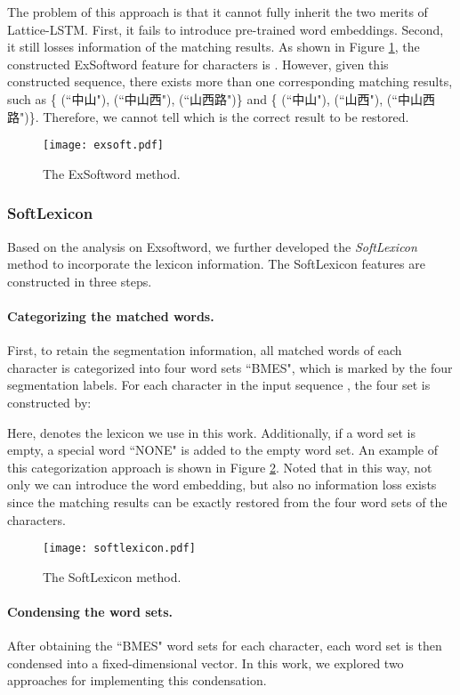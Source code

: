 \documentclass[11pt,a4paper]{article}
\begin{document}
\begin{CJK}{UTF8}{gbsn}
The problem of this approach is that it cannot fully inherit the two merits of Lattice-LSTM. First, it fails to introduce pre-trained word embeddings. Second, it still losses information of the matching results.
As shown in Figure \ref{fig:exsoft_figure}, the constructed ExSoftword feature for characters  is . However, given this constructed sequence, there exists more than one corresponding matching results, such as \{ (``中山"),  (``中山西"),  (``山西路")\} and \{ (``中山"),  (``山西"),  (``中山西路")\}. Therefore, we cannot tell which is the correct result to be restored.


\begin{figure}
\centering
\texttt{[image: exsoft.pdf]}
\caption{The ExSoftword method. }
\label{fig:exsoft_figure}
\end{figure}

\subsubsection{SoftLexicon} 
\label{sec:method}
Based on the analysis on Exsoftword, we further developed the \textit{SoftLexicon} method to incorporate the lexicon information.
The SoftLexicon features are constructed in three steps. 

\paragraph{Categorizing the matched words.}
First, to retain the segmentation information, all matched words of each character  is categorized into four word sets ``BMES", which is marked by the four segmentation labels. For each character  in the input sequence , the four set is constructed by:

Here,  denotes the lexicon we use in this work.
Additionally, if a word set is empty, a special word ``NONE" is added to the empty word set. An example of this categorization approach is shown in Figure \ref{fig:softlexicon_figure}. Noted that in this way, not only we can introduce the word embedding, but also no information loss exists since the matching results can be exactly restored from the four word sets of the characters.


\begin{figure}
\centering
\texttt{[image: softlexicon.pdf]}
\caption{The SoftLexicon method. }
\label{fig:softlexicon_figure}
\end{figure}


\paragraph{Condensing the word sets.}
After obtaining the ``BMES" word sets for each character, each word set is then condensed into a fixed-dimensional vector. In this work, we explored two approaches for implementing this condensation.


\end{CJK}
\end{document}
